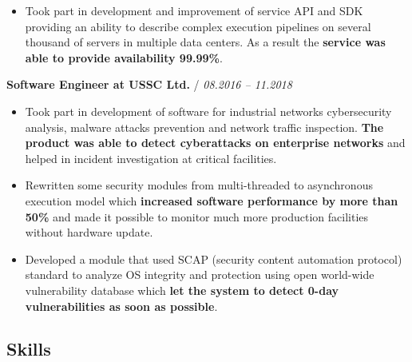 \documentclass[a4paper,10pt]{article}
\newcommand{\notice}[1]{{\textcolor{dark}{\textbf{#1}}}}
\newcommand{\info}[1]{{\textcolor{darkdark}{\textbf{#1}}}}
\begin{document}
\begin{adjustwidth}{10pt}{10pt}
\begin{itemize}
        \item Took part in development and improvement of service API and SDK providing an ability to describe complex execution pipelines on several thousand of servers in multiple data centers. As a result the \info{service was able to provide availability 99.99\%}.

        \end{itemize}


        \notice{Software Engineer at USSC Ltd.} / \textit{08.2016 – 11.2018}

        \begin{itemize}

        \item Took part in development of software for industrial networks cybersecurity analysis, malware attacks prevention and network traffic inspection. \info{The product was able to detect cyberattacks on enterprise networks} and helped in incident investigation at critical facilities.

        \item Rewritten some security modules from multi-threaded to asynchronous execution model which \info{increased software performance by more than 50\%} and made it possible to monitor much more production facilities without hardware update.

        \item Developed a module that used SCAP (security content automation protocol) standard to analyze OS integrity and protection using open world-wide vulnerability database which \info{let the system to detect 0-day vulnerabilities as soon as possible}.

        \end{itemize}

    \end{adjustwidth}

\subsection*{Skills}
\end{document}
